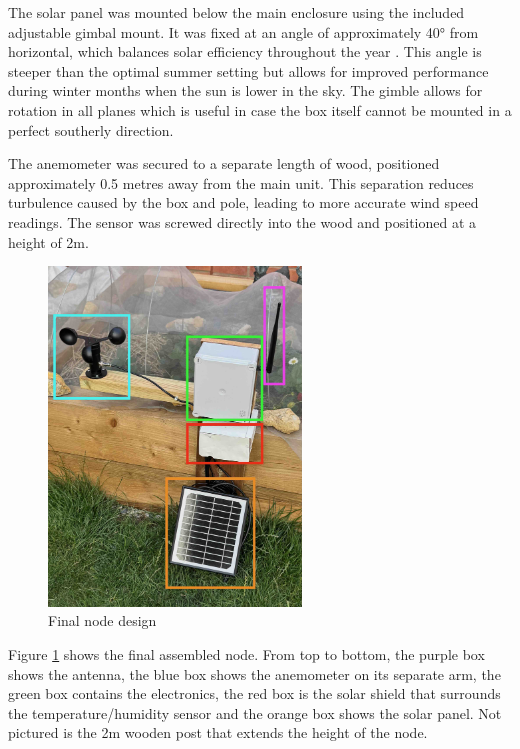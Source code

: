 The solar panel was mounted below the main enclosure using the included
adjustable gimbal mount. It was fixed at an angle of approximately 40° from
horizontal, which balances solar efficiency throughout the year
\cite{cathcart_best-solar-panel_2025}. This angle is steeper than the optimal
summer setting but allows for improved performance during winter months when the
sun is lower in the sky. The gimble allows for rotation in all planes which is
useful in case the box itself cannot be mounted in a perfect southerly
direction.

The anemometer was secured to a separate length of wood, positioned
approximately 0.5 metres away from the main unit. This separation reduces
turbulence caused by the box and pole, leading to more accurate wind speed
readings. The sensor was screwed directly into the wood and positioned at a
height of 2m.


\begin{figure}[H]
    \centering
    \includegraphics[width=0.6\textwidth]{contents/part-2/fig2/annotated-node.jpg}
    \caption{Final node design}
    \label{fig:assembled-node}
\end{figure}

Figure \ref{fig:assembled-node} shows the final assembled node. From top to
bottom, the purple box shows the antenna, the blue box shows the anemometer on
its separate arm, the green box contains the electronics, the red box is the
solar shield that surrounds the temperature/humidity sensor and the orange box
shows the solar panel. Not pictured is the 2m wooden post that extends the
height of the node.

